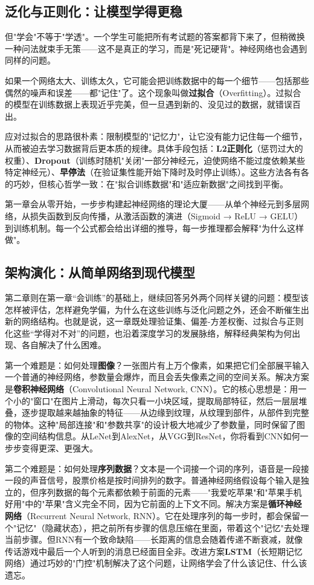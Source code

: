 \documentclass[lang=cn,zihao=-4,a4paper,fontset=windows]{beautybook}
\begin{document}
{\subsection*{泛化与正则化：让模型学得更稳}

但"学会"不等于"学透"。一个学生可能把所有考试题的答案都背下来了，但稍微换一种问法就束手无策——这不是真正的学习，而是"死记硬背"。神经网络也会遇到同样的问题。

如果一个网络太大、训练太久，它可能会把训练数据中的每一个细节——包括那些偶然的噪声和误差——都"记住"了。这个现象叫做\textbf{过拟合}（Overfitting）。过拟合的模型在训练数据上表现近乎完美，但一旦遇到新的、没见过的数据，就错误百出。

应对过拟合的思路很朴素：限制模型的"记忆力"，让它没有能力记住每一个细节，从而被迫去学习数据背后更本质的规律。具体手段包括：\textbf{L2正则化}（惩罚过大的权重）、\textbf{Dropout}（训练时随机"关闭"一部分神经元，迫使网络不能过度依赖某些特定神经元）、\textbf{早停法}（在验证集性能开始下降时及时停止训练）。这些方法各有各的巧妙，但核心哲学一致：在"拟合训练数据"和"适应新数据"之间找到平衡。

第一章会从零开始，一步步构建起神经网络的理论大厦——从单个神经元到多层网络，从损失函数到反向传播，从激活函数的演进（Sigmoid → ReLU → GELU）到训练机制。每一个公式都会给出详细的推导，每一步推理都会解释"为什么这样做"。

\subsection*{架构演化：从简单网络到现代模型}

第二章则在第一章“会训练”的基础上，继续回答另外两个同样关键的问题：模型该怎样被评估，怎样避免学偏，为什么在这些训练与泛化问题之外，还会不断催生出新的网络结构。也就是说，这一章既处理验证集、偏差-方差权衡、过拟合与正则化这些“学得对不对”的问题，也沿着深度学习的发展脉络，解释经典架构为何出现、各自解决了什么困难。

第一个难题是：如何处理\textbf{图像}？一张图片有上万个像素，如果把它们全部展平输入一个普通的神经网络，参数量会爆炸，而且会丢失像素之间的空间关系。解决方案是\textbf{卷积神经网络}（Convolutional Neural Network, CNN）。它的核心思想是：用一个小的"窗口"在图片上滑动，每次只看一小块区域，提取局部特征，然后一层层堆叠，逐步提取越来越抽象的特征——从边缘到纹理，从纹理到部件，从部件到完整的物体。这种"局部连接"和"参数共享"的设计极大地减少了参数量，同时保留了图像的空间结构信息。从LeNet到AlexNet，从VGG到ResNet，你将看到CNN如何一步步变得更深、更强大。

第二个难题是：如何处理\textbf{序列数据}？文本是一个词接一个词的序列，语音是一段接一段的声音信号，股票价格是按时间排列的数字。普通神经网络假设每个输入是独立的，但序列数据的每个元素都依赖于前面的元素——"我爱吃苹果"和"苹果手机好用"中的"苹果"含义完全不同，因为它前面的上下文不同。解决方案是\textbf{循环神经网络}（Recurrent Neural Network, RNN）。它在处理序列的每一步时，都会保留一个"记忆"（隐藏状态），把之前所有步骤的信息压缩在里面，带着这个"记忆"去处理当前步骤。但RNN有一个致命缺陷——长距离的信息会随着传递不断衰减，就像传话游戏中最后一个人听到的消息已经面目全非。改进方案\textbf{LSTM}（长短期记忆网络）通过巧妙的"门控"机制解决了这个问题，让网络学会了什么该记住、什么该遗忘。

}
\end{document}
